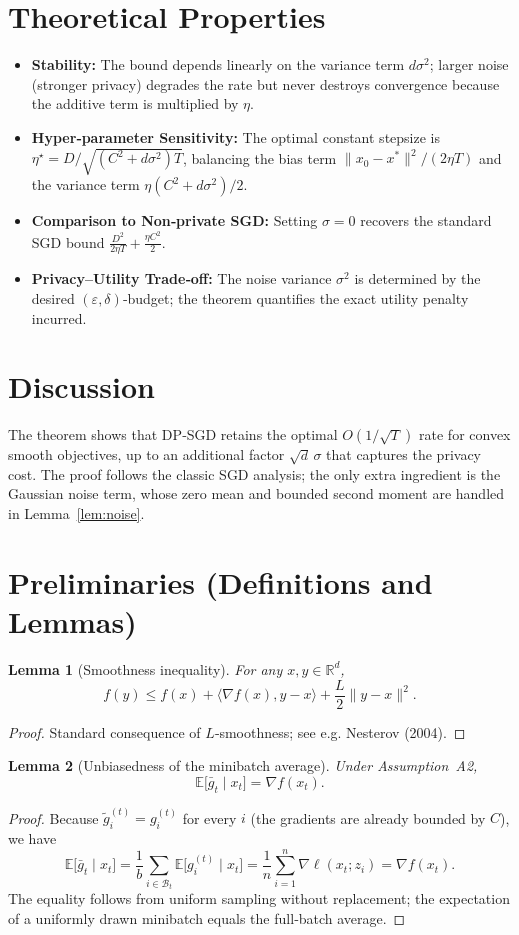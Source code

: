 \documentclass{article}
\newtheorem{lemma}{Lemma}
\newcommand{\EE}{\mathbb{E}}
\newcommand{\RR}{\mathbb{R}}
\begin{document}
\section*{Theoretical Properties}
\begin{itemize}
\item \textbf{Stability:} The bound depends linearly on the variance term
$d\sigma^{2}$; larger noise (stronger privacy) degrades the rate but never
destroys convergence because the additive term is multiplied by $\eta$.
\item \textbf{Hyper‑parameter Sensitivity:} The optimal constant stepsize is
$\eta^{\star}=D/\sqrt{(C^{2}+d\sigma^{2})T}$, balancing the bias term
$\|x_0-x^{*}\|^{2}/(2\eta T)$ and the variance term $\eta(C^{2}+d\sigma^{2})/2$.
\item \textbf{Comparison to Non‑private SGD:} Setting $\sigma=0$ recovers the
standard SGD bound $\frac{D^{2}}{2\eta T}+\frac{\eta C^{2}}{2}$.
\item \textbf{Privacy–Utility Trade‑off:} The noise variance $\sigma^{2}$
is determined by the desired $(\varepsilon,\delta)$‑budget; the theorem
quantifies the exact utility penalty incurred.
\end{itemize}

\section*{Discussion}
The theorem shows that DP‑SGD retains the optimal $O(1/\sqrt{T})$ rate for
convex smooth objectives, up to an additional factor $\sqrt{d}\,\sigma$ that
captures the privacy cost.  The proof follows the classic SGD analysis;
the only extra ingredient is the Gaussian noise term, whose zero mean and
bounded second moment are handled in Lemma~\ref{lem:noise}.

\newpage
\section*{Preliminaries (Definitions and Lemmas)}
\begin{lemma}[Smoothness inequality]\label{lem:smooth}
For any $x,y\in\RR^{d}$,
\[
f(y)\le f(x)+\langle\nabla f(x),y-x\rangle+\frac{L}{2}\|y-x\|^{2}.
\]
\end{lemma}
\begin{proof}
Standard consequence of $L$‑smoothness; see e.g. Nesterov (2004). \qedhere
\end{proof}

\begin{lemma}[Unbiasedness of the minibatch average]\label{lem:unbiased}
Under Assumption~A2,
\[
\EE\!\bigl[\bar g_t\mid x_t\bigr]=\nabla f(x_t).
\]
\end{lemma}
\begin{proof}
Because $\tilde g_i^{(t)}=g_i^{(t)}$ for every $i$ (the gradients are already
bounded by $C$), we have
\[
\EE\!\bigl[\bar g_t\mid x_t\bigr]
=\frac{1}{b}\sum_{i\in\mathcal B_t}\EE\!\bigl[g_i^{(t)}\mid x_t\bigr]
=\frac{1}{n}\sum_{i=1}^{n}\nabla\ell(x_t;z_i)=\nabla f(x_t).
\]
The equality follows from uniform sampling without replacement; the
expectation of a uniformly drawn minibatch equals the full‑batch average.
\end{proof}
\end{document}
